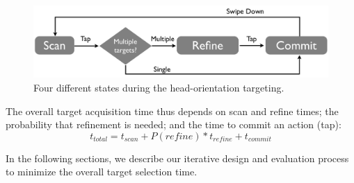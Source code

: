 \begin{figure}[t!]
\centering
\includegraphics[width=\columnwidth]{figures/interactionModel2.pdf}
\caption{Four different states during the head-orientation targeting.}
\label{fig:interaction}
\end{figure}

The overall target acquisition time thus depends on scan and refine times; the probability that refinement is needed; and the time to commit an action (tap):
\begin{equation}
t_{total}=t_{scan}+P(refine)*t_{refine}+t_{commit}
\label{eq:time}
\end{equation}

In the following sections, we describe our iterative design and evaluation process to minimize the overall target selection time.


